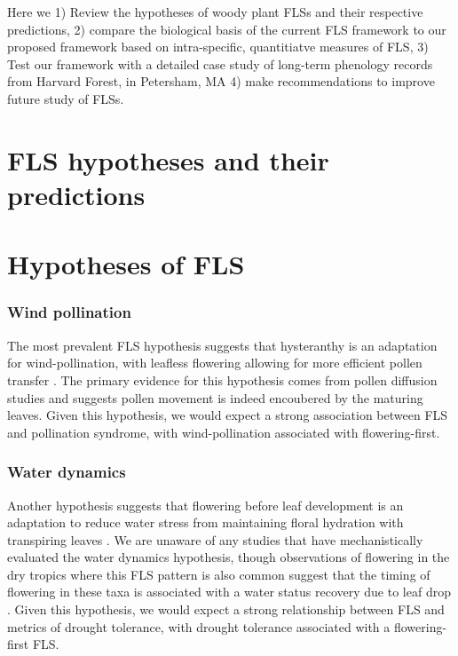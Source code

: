 \documentclass{article}
\begin{document}
\noindent Here we 1) Review the hypotheses of woody plant FLSs and their respective predictions, 2) compare the biological basis of the current FLS framework to our proposed framework based on intra-specific, quantitiatve measures of FLS, 3) Test our framework with a detailed case study of long-term phenology records from Harvard Forest, in Petersham, MA 4) make recommendations to improve future study of FLSs.
\section*{FLS hypotheses and their predictions}
\section*{Hypotheses of FLS}
\subsubsection*{ Wind pollination}
\noindent The most prevalent FLS hypothesis suggests that hysteranthy is an adaptation for wind-pollination, with leafless flowering allowing for more efficient pollen transfer \citep{Whitehead1969, Spurr1980,Friedman2009}. The primary evidence for this hypothesis comes from pollen diffusion studies \citep[e.g., particle movement through closed and open canopies][]{Niklas1985,Nathan2005, Milleron2012} and suggests pollen movement is indeed encoubered by the maturing leaves. Given this hypothesis, we would expect a strong association between FLS and pollination syndrome, with wind-pollination associated with flowering-first.

\subsubsection*{Water dynamics}
\noindent Another hypothesis suggests that flowering before leaf development is an adaptation to reduce water stress from maintaining floral hydration with transpiring leaves \citep{Franklin2016}. We are unaware of any studies that have mechanistically evaluated the water dynamics hypothesis, though observations of flowering in the dry tropics where this FLS pattern is also common suggest that the timing of flowering in these taxa is associated with a water status recovery due to leaf drop \citep{Borchert1983,Reich1984}. Given this hypothesis, we would expect a strong relationship between FLS and metrics of drought tolerance, with drought tolerance associated with a flowering-first FLS.  
\end{document}
